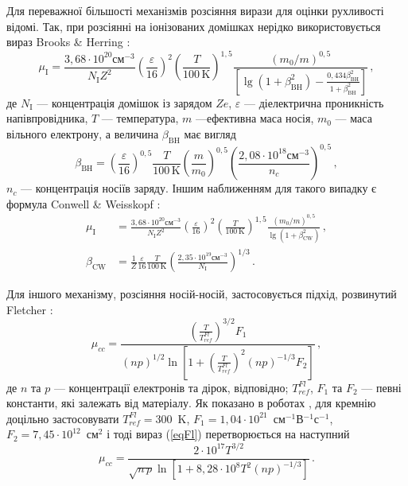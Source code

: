 \documentclass[12pt,a4paper,titlepage,oneside]{book}
\numberwithin{equation}{part}
\begin{document}
Для переважної більшості механізмів розсіяння вирази для оцінки рухливості відомі.
Так, при розсіянні на іонізованих домішках нерідко використовується вираз Brooks \& Herring \cite{Seeger2004}:
\begin{equation}\label{eqBH}
  \mu_\mathrm{I}=\frac{3,68\cdot10^{20}\text{см}^{-3}}{N_\mathrm{I}Z^2}\left(\frac{\varepsilon}{16}\right)^2\left(\frac{T}{100\,\mathrm{K}}\right)^{1,5}
  \frac{\left({m_0}/{m}\right)^{0,5}}{\left[\lg(1+\beta^2_\mathrm{BH})-\frac{0,434\beta^2_\mathrm{BH}}{1+\beta^2_\mathrm{BH}}\right]}\,,
\end{equation}
де
$N_\mathrm{I}$ --- концентрація домішок із зарядом $Ze$,
$\varepsilon$ --- діелектрична проникність напівпровідника,
$T$ --- температура,
$m$ ---ефективна маса носія,
$m_0$ --- маса вільного електрону,
а величина $\beta_\mathrm{BH}$ має вигляд
\begin{equation}\label{eqBH2}
  \beta_\mathrm{BH}=\left(\frac{\varepsilon}{16}\right)^{0,5} \frac{T}{100\,\mathrm{K}} \left(\frac{m}{m_0}\right)^{0,5}
  \left(\frac{2,08\cdot10^{18}\text{см}^{-3}}{n_c}\right)^{0,5}\,,
\end{equation}
$n_c$ --- концентрація носіїв заряду.
Іншим наближенням для такого випадку є формула Conwell \& Weisskopf \cite{Seeger2004}:
\begin{equation}\label{eqCW}
\begin{aligned}
    \mu_\mathrm{I} &=\frac{3,68\cdot10^{20}\text{см}^{-3}}{N_\mathrm{I}Z^2}\left(\frac{\varepsilon}{16}\right)^2\left(\frac{T}{100\,\mathrm{K}}\right)^{1,5}
  \frac{\left({m_0}/{m}\right)^{0,5}}{\lg\left(1+\beta^2_\mathrm{CW}\right)}\,, \\
   \beta_\mathrm{CW} &=\frac{1}{Z} \frac{\varepsilon}{16}\frac{T}{100\,\mathrm{K}}\left(\frac{2,35\cdot10^{19}\text{см}^{-3}}{N_\mathrm{I}}\right)^{1/3}\,.
\end{aligned}
\end{equation}

Для іншого механізму, розсіяння носій-носій, застосовується підхід, розвинутий Fletcher \cite{Fletcher1957}:
\begin{equation}\label{eqFl}
  \mu_{cc}=\frac{\left(\frac{T}{T_{ref}^{Fl}}\right)^{3/2} F_1}{\left(np\right)^{1/2}\ln\left[1+\left(\frac{T}{T_{ref}^{Fl}}\right)^2\left(np\right)^{-1/3}F_2\right]}\,,
\end{equation}
де
$n$ та $p$ --- концентрації електронів та дірок, відповідно;
$T_{ref}^{Fl}$, $F_1$ та $F_2$ --- певні константи, які залежать від матеріалу.
Як показано в роботах \cite{Choo1972,Dorkel1981}, для кремнію доцільно застосовувати
$T_{ref}^{Fl}=300$~K,
$F_1=1,04\cdot10^{21}$~см$^{-1}$В$^{-1}$с$^{-1}$,
$F_2=7,45\cdot10^{12}$~см$^2$ і тоді вираз (\ref{eqFl}) перетворюється на наступний
\begin{equation}\label{eqDorkel}
  \mu_{cc}=\frac{2\cdot10^{17}T^{3/2}}{\sqrt{n\,p}\ln\left[1+8,28\cdot10^8T^2\left(np\right)^{-1/3}\right]}\,.
\end{equation}
\end{document}
